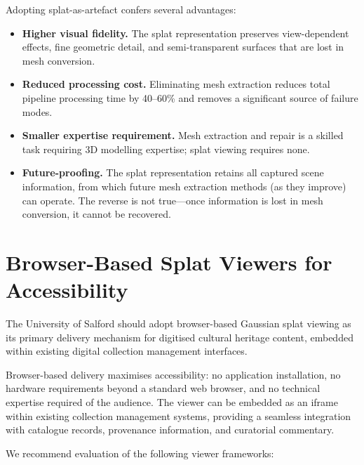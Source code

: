 Adopting splat-as-artefact confers several advantages:

\begin{itemize}
  \item \textbf{Higher visual fidelity.} The splat representation preserves view-dependent effects, fine geometric detail, and semi-transparent surfaces that are lost in mesh conversion.
  \item \textbf{Reduced processing cost.} Eliminating mesh extraction reduces total pipeline processing time by 40--60\% and removes a significant source of failure modes.
  \item \textbf{Smaller expertise requirement.} Mesh extraction and repair is a skilled task requiring 3D modelling expertise; splat viewing requires none.
  \item \textbf{Future-proofing.} The splat representation retains all captured scene information, from which future mesh extraction methods (as they improve) can operate. The reverse is not true---once information is lost in mesh conversion, it cannot be recovered.
\end{itemize}

\section{Browser-Based Splat Viewers for Accessibility}
\label{sec:rec-browser}

\begin{recommendation}
The University of Salford should adopt browser-based Gaussian splat viewing as its primary delivery mechanism for digitised cultural heritage content, embedded within existing digital collection management interfaces.
\end{recommendation}

Browser-based delivery maximises accessibility: no application installation, no hardware requirements beyond a standard web browser, and no technical expertise required of the audience. The viewer can be embedded as an iframe within existing collection management systems, providing a seamless integration with catalogue records, provenance information, and curatorial commentary.

We recommend evaluation of the following viewer frameworks:

